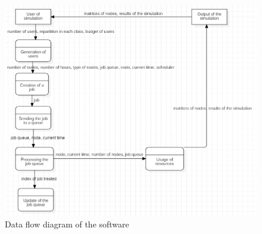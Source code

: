 \documentclass [10 pt, a4 paper]{report}
\begin{document}
\\ \\

\begin{figure}[!htbp]
\centering
\includegraphics[width=1.3\textwidth]{DataFlowDiag.jpg}
\caption{\label{fig:image} Data flow diagram of the software}
\end{figure}
\\
\end{document}
